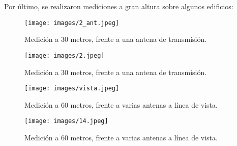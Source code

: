 Por último, se realizaron mediciones a gran altura sobre algunos edificios: 

\begin{figure}[H]
\centering
\texttt{[image: images/2\_ant.jpeg]}
\caption{Medición a 30 metros, frente a una antena de transmisión.}
\label{4.4}
\end{figure}

\begin{figure}[H]
\centering
\texttt{[image: images/2.jpeg]}
\caption{Medición a 30 metros, frente a una antena de transmisión.}
\label{4.5}
\end{figure}


\begin{figure}[H]
\centering
\texttt{[image: images/vista.jpeg]}
\caption{Medición a 60 metros, frente a varias antenas a línea de vista.}
\label{4.6}
\end{figure}

\begin{figure}[H]
\centering
\texttt{[image: images/14.jpeg]}
\caption{Medición a 60 metros, frente a varias antenas a línea de vista.}
\label{4.7}
\end{figure}
